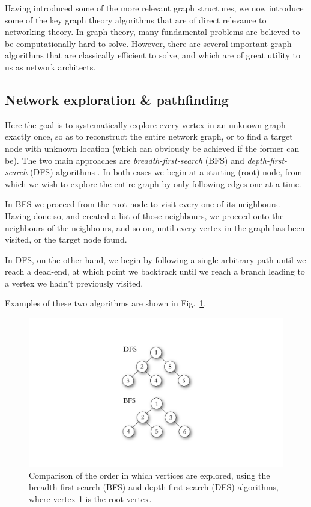 \documentclass[aps,rmp,twocolumn,amsmath,amssymb,nofootinbib,superscriptaddress,longbibliography,floatfix]{revtex4-1}
\begin{document}
Having introduced some of the more relevant graph structures, we now introduce some of the key graph theory algorithms that are of direct relevance to networking theory. In graph theory, many fundamental problems are believed to be computationally hard to solve. However, there are several important graph algorithms that are classically efficient to solve, and which are of great utility to us as network architects.

%
%

\subsection{Network exploration \& pathfinding} \label{sec:path_exp}

Here the goal is to systematically explore every vertex in an unknown graph exactly once, so as to reconstruct the entire network graph, or to find a target node with unknown location (which can obviously be achieved if the former can be). The two main approaches are \emph{breadth-first-search} (BFS) and \emph{depth-first-search} (DFS) algorithms \cite{???}. In both cases we begin at a starting (root) node, from which we wish to explore the entire graph by only following edges one at a time.

In BFS we proceed from the root node to visit every one of its neighbours. Having done so, and created a list of those neighbours, we proceed onto the neighbours of the neighbours, and so on, until every vertex in the graph has been visited, or the target node found.

In DFS, on the other hand, we begin by following a single arbitrary path until we reach a dead-end, at which point we backtrack until we reach a branch leading to a vertex we hadn't previously visited.

Examples of these two algorithms are shown in Fig.~\ref{fig:BFS_DFS}.

\begin{figure}[!htb]
\includegraphics[width=0.6\columnwidth]{BFS_DFS}
\caption{Comparison of the order in which vertices are explored, using the breadth-first-search (BFS) and depth-first-search (DFS) algorithms, where vertex 1 is the root vertex.} \label{fig:BFS_DFS}
\end{figure}
\end{document}
